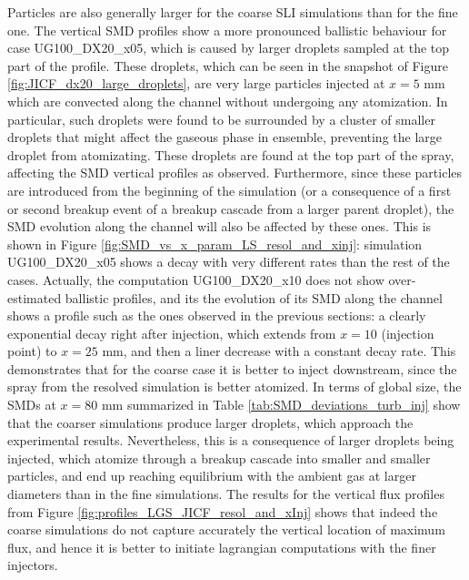 Particles are also generally larger for the coarse SLI simulations than for the fine one. The vertical SMD profiles show a more pronounced ballistic behaviour for case UG100\_DX20\_x05, which is caused by larger droplets sampled at the top part of the profile. These droplets, which can be seen in the snapshot of Figure \ref{fig:JICF_dx20_large_droplets}, are very large particles injected at $x = 5$ mm which are convected along the channel without undergoing any atomization. In particular, such droplets were found to be surrounded by a cluster of smaller droplets that might affect the gaseous phase in ensemble, preventing the large droplet from atomizating. These droplets are found at the top part of the spray, affecting the SMD vertical profiles as observed. Furthermore, since these particles are introduced from the beginning of the simulation (or a consequence of a first or second breakup event of a breakup cascade from a larger parent droplet), the SMD evolution along the channel will also be affected by these ones. This is shown in Figure \ref{fig:SMD_vs_x_param_LS_resol_and_xinj}: simulation UG100\_DX20\_x05 shows a decay with very different rates than the rest of the cases. Actually, the computation UG100\_DX20\_x10 does not show over-estimated ballistic profiles, and its the evolution of its SMD along the channel shows a profile such as the ones observed in the previous sections: a clearly exponential decay right after injection, which extends from $x = 10$ (injection point) to $x = 25$ mm, and then a liner decrease with a constant decay rate. This demonstrates that for the coarse case it is better to inject downstream, since the spray from the resolved simulation is better atomized. In terms of global size, the SMDs at $x = 80$ mm summarized in Table \ref{tab:SMD_deviations_turb_inj} show that the coarser simulations produce larger droplets, which approach the experimental results. Nevertheless, this is a consequence of larger droplets being injected, which atomize through a breakup cascade into smaller and smaller particles, and end up reaching equilibrium with the ambient gas at larger diameters than in the fine simulations. The results for the vertical flux profiles from Figure \ref{fig:profiles_LGS_JICF_resol_and_xInj} shows that indeed the coarse simulations do not capture accurately the vertical location of maximum flux, and hence it is better to initiate lagrangian computations with the finer injectors.



